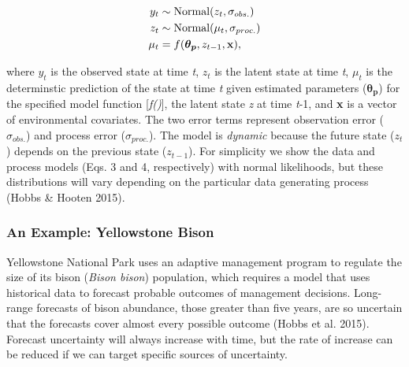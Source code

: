 \documentclass[12pt,]{article}
\begin{document}
\begin{align}
y_t &\sim \text{Normal}(z_t, \sigma_{obs.}) \\
z_t &\sim \text{Normal}(\mu_t, \sigma_{proc.}) \\
\mu_t &= f(\boldsymbol{\theta_p},z_{t-1},\bold{x}),
\end{align}

\vspace{-2em} where \(y_t\) is the observed state at time \emph{t},
\(z_t\) is the latent state at time \emph{t}, \(\mu_t\) is the
determinstic prediction of the state at time \emph{t} given estimated
parameters (\(\boldsymbol{\theta_p}\)) for the specified model function
{[}\emph{f()}{]}, the latent state \emph{z} at time \emph{t}-1, and
\textbf{x} is a vector of environmental covariates. The two error terms
represent observation error (\(\sigma_{obs.}\)) and process error
(\(\sigma_{proc.}\)). The model is \emph{dynamic} because the future
state (\(z_t\)) depends on the previous state (\(z_{t-1}\)). For
simplicity we show the data and process models (Eqs. 3 and 4,
respectively) with normal likelihoods, but these distributions will vary
depending on the particular data generating process (Hobbs \& Hooten
2015).

\subsubsection{An Example: Yellowstone Bison}

Yellowstone National Park uses an adaptive management program to
regulate the size of its bison (\emph{Bison bison}) population, which
requires a model that uses historical data to forecast probable outcomes
of management decisions. Long-range forecasts of bison abundance, those
greater than five years, are so uncertain that the forecasts cover
almost every possible outcome (Hobbs et al. 2015). Forecast uncertainty
will always increase with time, but the rate of increase can be reduced
if we can target specific sources of uncertainty.
\end{document}
